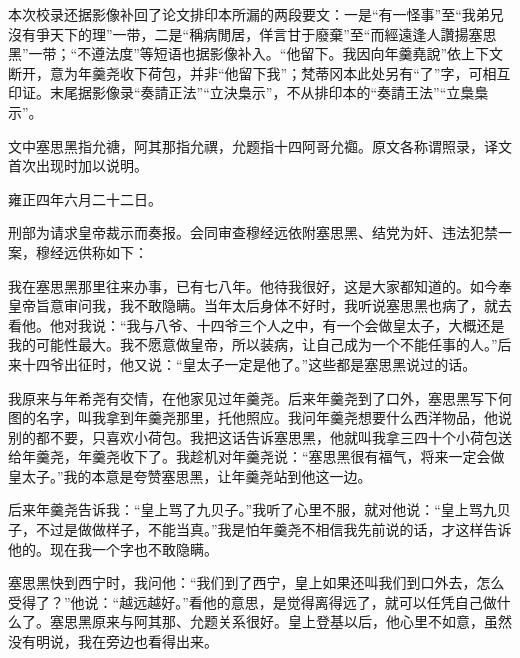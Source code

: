 本次校录还据影像补回了论文排印本所漏的两段要文：一是“有一怪事”至“我弟兄沒有爭天下的理”一带，二是“稱病閒居，佯言甘于廢棄”至“而經遠逢人讚揚塞思黑”一带；“不遵法度”等短语也据影像补入。“他留下。我因向年羹堯說”依上下文断开，意为年羹尧收下荷包，并非“他留下我”；梵蒂冈本此处另有“了”字，可相互印证。末尾据影像录“奏請正法”“立決梟示”，不从排印本的“奏請王法”“立梟梟示”。\par
文中塞思黑指允禟，阿其那指允禩，允题指十四阿哥允禵。原文各称谓照录，译文首次出现时加以说明。\par
\begingroup\bookkai
雍正四年六月二十二日。\par
刑部为请求皇帝裁示而奏报。会同审查穆经远依附塞思黑、结党为奸、违法犯禁一案，穆经远供称如下：\par
我在塞思黑那里往来办事，已有七八年。他待我很好，这是大家都知道的。如今奉皇帝旨意审问我，我不敢隐瞒。当年太后身体不好时，我听说塞思黑也病了，就去看他。他对我说：“我与八爷、十四爷三个人之中，有一个会做皇太子，大概还是我的可能性最大。我不愿意做皇帝，所以装病，让自己成为一个不能任事的人。”后来十四爷出征时，他又说：“皇太子一定是他了。”这些都是塞思黑说过的话。\par
我原来与年希尧有交情，在他家见过年羹尧。后来年羹尧到了口外，塞思黑写下何图的名字，叫我拿到年羹尧那里，托他照应。我问年羹尧想要什么西洋物品，他说别的都不要，只喜欢小荷包。我把这话告诉塞思黑，他就叫我拿三四十个小荷包送给年羹尧，年羹尧收下了。我趁机对年羹尧说：“塞思黑很有福气，将来一定会做皇太子。”我的本意是夸赞塞思黑，让年羹尧站到他这一边。\par
后来年羹尧告诉我：“皇上骂了九贝子。”我听了心里不服，就对他说：“皇上骂九贝子，不过是做做样子，不能当真。”我是怕年羹尧不相信我先前说的话，才这样告诉他的。现在我一个字也不敢隐瞒。\par
塞思黑快到西宁时，我问他：“我们到了西宁，皇上如果还叫我们到口外去，怎么受得了？”他说：“越远越好。”看他的意思，是觉得离得远了，就可以任凭自己做什么了。塞思黑原来与阿其那、允题关系很好。皇上登基以后，他心里不如意，虽然没有明说，我在旁边也看得出来。\par
